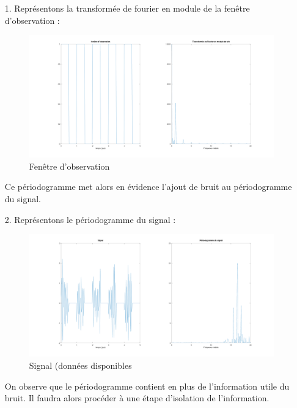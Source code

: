 \documentclass[12pt,a4paper,titlepage]{article}
\begin{document}
\begin{enumerate}

    \item[1.] 
        Représentons la transformée de fourier en module de la fenêtre d'observation :

        \begin{figure}[H]
            \caption{Fenêtre d'observation}
            \includegraphics[width=\textwidth]{win}
            \centering
        \end{figure}

    Ce périodogramme met alors en évidence l'ajout de bruit au périodogramme du signal.

    \item[2.] 
        Représentons le périodogramme du signal :

        \begin{figure}[H]
            \caption{Signal (données disponibles}
            \includegraphics[width=\textwidth]{periodogramme_sig}
            \centering
        \end{figure}

    On observe que le périodogramme contient en plus de l'information utile du bruit.
    Il faudra alors procéder à une étape d'isolation de l'information.


\end{enumerate}
\end{document}
